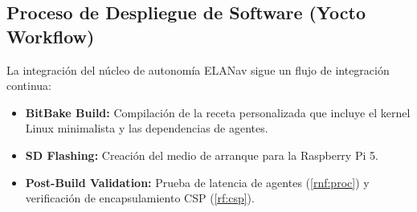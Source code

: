 \subsection{Proceso de Despliegue de Software (Yocto Workflow)}
La integración del núcleo de autonomía ELANav sigue un flujo de integración continua:
\begin{itemize}
    \item \textbf{BitBake Build:} Compilación de la receta personalizada que incluye el kernel Linux minimalista y las dependencias de agentes.
    \item \textbf{SD Flashing:} Creación del medio de arranque para la Raspberry Pi 5.
    \item \textbf{Post-Build Validation:} Prueba de latencia de agentes (\cref{rnf:proc}) y verificación de encapsulamiento CSP (\cref{rf:csp}).
\end{itemize}

